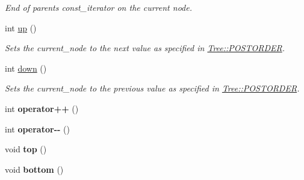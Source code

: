 \begin{DoxyCompactItemize}
\begin{DoxyCompactList}\small\item\em End of parents {\ttfamily const\+\_\+iterator} on the current node. \end{DoxyCompactList}\item 
int \hyperlink{classpruner_1_1TreeIterator_adca1d999f093a69e2f5d044b358e5da7}{up} ()\hypertarget{classpruner_1_1TreeIterator_adca1d999f093a69e2f5d044b358e5da7}{}\label{classpruner_1_1TreeIterator_adca1d999f093a69e2f5d044b358e5da7}

\begin{DoxyCompactList}\small\item\em Sets the {\ttfamily current\+\_\+node} to the next value as specified in \hyperlink{classpruner_1_1Tree_a547937e845fdbceafae4db25cd74f880}{Tree\+::\+P\+O\+S\+T\+O\+R\+D\+ER}. \end{DoxyCompactList}\item 
int \hyperlink{classpruner_1_1TreeIterator_a8534adba213df8f7f1e67bf5005d902e}{down} ()\hypertarget{classpruner_1_1TreeIterator_a8534adba213df8f7f1e67bf5005d902e}{}\label{classpruner_1_1TreeIterator_a8534adba213df8f7f1e67bf5005d902e}

\begin{DoxyCompactList}\small\item\em Sets the {\ttfamily current\+\_\+node} to the previous value as specified in \hyperlink{classpruner_1_1Tree_a547937e845fdbceafae4db25cd74f880}{Tree\+::\+P\+O\+S\+T\+O\+R\+D\+ER}. \end{DoxyCompactList}\item 
int {\bfseries operator++} ()\hypertarget{classpruner_1_1TreeIterator_aed2ad905c7c0cef8c2fd8e012c67dc5c}{}\label{classpruner_1_1TreeIterator_aed2ad905c7c0cef8c2fd8e012c67dc5c}

\item 
int {\bfseries operator-\/-\/} ()\hypertarget{classpruner_1_1TreeIterator_a08d18c38de3157a78b9d02899a605ed8}{}\label{classpruner_1_1TreeIterator_a08d18c38de3157a78b9d02899a605ed8}

\item 
void {\bfseries top} ()\hypertarget{classpruner_1_1TreeIterator_a41f74b1ac47cd05ce7e08b46c93034f1}{}\label{classpruner_1_1TreeIterator_a41f74b1ac47cd05ce7e08b46c93034f1}

\item 
void {\bfseries bottom} ()\hypertarget{classpruner_1_1TreeIterator_a1c8244cded3c2a573d2914549a19e177}{}\label{classpruner_1_1TreeIterator_a1c8244cded3c2a573d2914549a19e177}


\end{DoxyCompactItemize}

